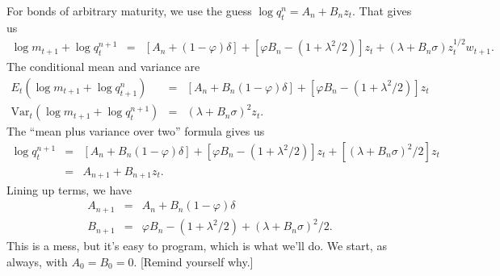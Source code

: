 \documentclass[11pt]{article}
\begin{document}
For bonds of arbitrary maturity,
we use the guess  $ \log q^n_t = A_n + B_n z_t$.
That gives us
\begin{eqnarray*}
    \log m_{t+1} + \log q^{n+1}_t &=&
            [A_n + (1-\varphi) \delta] + [\varphi B_n -(1+\lambda^2/2)] z_t
                    + (\lambda + B_n \sigma) z_t^{1/2} w_{t+1} .
\end{eqnarray*}
The conditional mean and variance are
\begin{eqnarray*}
   E_t \left( \log m_{t+1} + \log q^{n}_{t+1} \right) &=&
            [A_n + B_n (1-\varphi) \delta] + [\varphi B_n -(1+\lambda^2/2)] z_t \\
   \mbox{Var}_t \left( \log m_{t+1} + \log q^{n+1}_t \right) &=&
            (\lambda + B_n \sigma)^2 z_t .
\end{eqnarray*}
The ``mean plus variance over two'' formula gives us
\begin{eqnarray*}
    \log q^{n+1}_t &=&
            [A_n + B_n (1-\varphi) \delta] + [\varphi B_n -(1+\lambda^2/2)] z_t
                    + [(\lambda + B_n \sigma)^2/2]  z_t  \\
                &=& A_{n+1} + B_{n+1} z_t.
\end{eqnarray*}
Lining up terms, we have
\begin{eqnarray*}
    A_{n+1} &=& A_n + B_n (1-\varphi) \delta \\
    B_{n+1} &=& \varphi B_n -(1+\lambda^2/2) + (\lambda + B_n \sigma)^2/2 .
\end{eqnarray*}
This is a mess, but it's easy to program, which is what we'll do.
We start, as always, with $A_0 = B_0 = 0$.
[Remind yourself why.]

\begin{comment}
\begin{table}[h]
\centering
\caption{Properties of forward rates}
\begin{tabular}{lrrr}
\toprule
Forward rate $f^n_t$    &  Mean  &  Std Dev  &  Autocorr \\
\midrule
$f^0_t$                 &  6.683 & 2.703     &  0.959   \\
$f^{12}_t$              &  7.921 & 2.495     &  0.969   \\
$f^{120}_t$             &  8.858 & 1.946     &  0.980   \\
\bottomrule
\end{tabular}
\label{tab:forward-moments}
\end{table}
\end{comment}
\end{document}
